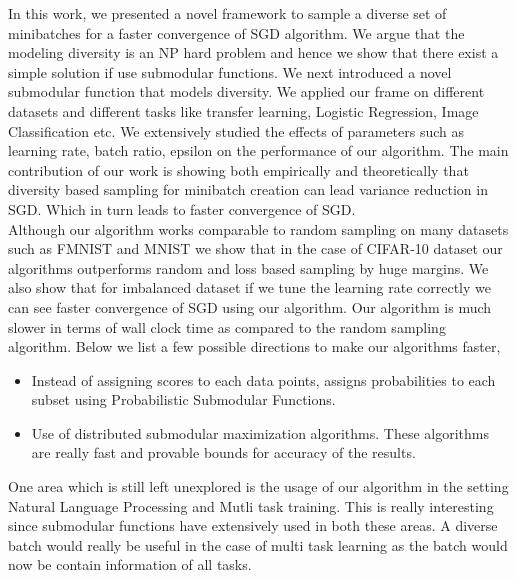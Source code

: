 \documentclass[a4paper,twoside]{iiththesis}
\theoremstyle{definition}
\theoremstyle{definition}
\theoremstyle{remark}
\begin{document}
In this work, we presented a novel framework to sample a diverse set of minibatches for a faster convergence of SGD algorithm. We argue that the modeling diversity is an  NP hard problem and hence we show that there exist a simple solution if use submodular functions. We next introduced a novel submodular function that models diversity. We applied our frame on different datasets and different tasks like transfer learning, Logistic Regression, Image Classification etc. We extensively studied the effects of parameters such as learning rate, batch ratio, epsilon on the performance of our algorithm. 
The main contribution of our work is showing both empirically and theoretically that diversity based sampling for minibatch creation can lead variance reduction in SGD. Which in turn leads to faster convergence of SGD. \\
Although our algorithm works comparable to random sampling on many datasets such as FMNIST and MNIST we show that in the case of CIFAR-10 dataset our algorithms outperforms random and loss based sampling by huge margins. We also show that for imbalanced dataset if we tune the learning rate correctly we can see faster convergence of SGD using our algorithm. Our algorithm is much slower in terms of wall clock time as compared to the random sampling algorithm. Below we list a few possible directions to make our algorithms faster,
\begin{itemize}
\item Instead of assigning scores to each data points, assigns probabilities to each subset using Probabilistic Submodular Functions.
\item Use of distributed submodular maximization algorithms. These algorithms are really fast and provable bounds for accuracy of the results.
\end{itemize}
One area which is still left unexplored is the usage of our algorithm in the setting Natural Language Processing and Mutli task training. This is really interesting since submodular functions have extensively used in both these areas. A diverse batch would really be useful in the case of multi task learning as the batch would now be contain information of all tasks.
\clearpage
\newpage
{} %


\end{document}
